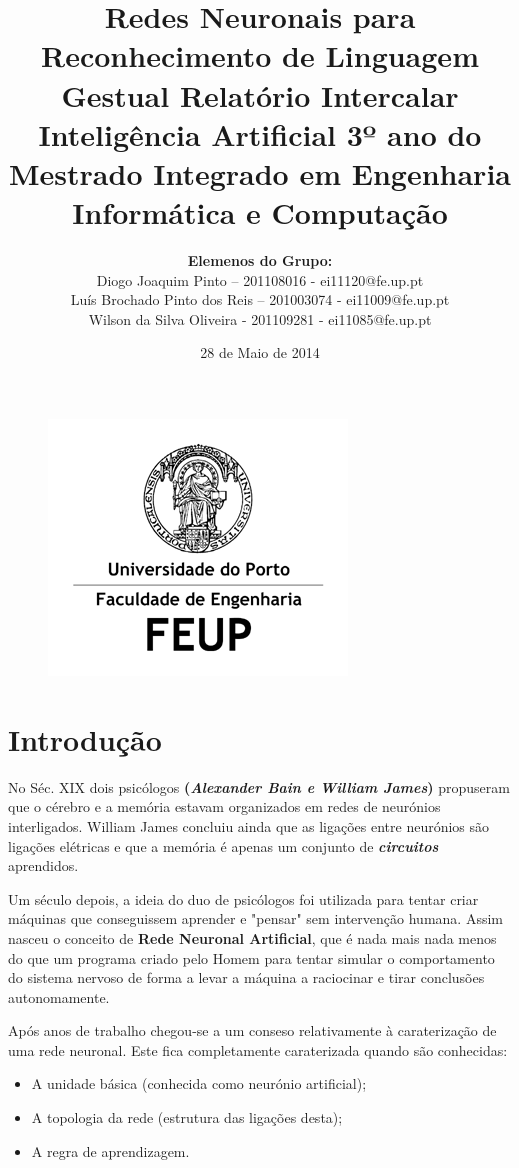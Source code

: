 \documentclass[10pt,a4paper]{article}
\title{\Huge\textbf{Redes Neuronais para Reconhecimento de Linguagem Gestual}\linebreak\linebreak\linebreak
\Large\textbf{Relatório Intercalar}\linebreak\linebreak
\Large{Inteligência Artificial}\linebreak
\Large{3º ano do Mestrado Integrado em Engenharia Informática e Computação} \linebreak \linebreak}
\author{\textbf{Elemenos do Grupo:}\\ Diogo Joaquim Pinto – 201108016 - ei11120@fe.up.pt \\ Luís Brochado Pinto dos Reis – 201003074 - ei11009@fe.up.pt \\ Wilson da Silva Oliveira - 201109281 - ei11085@fe.up.pt}
\date{28 de Maio de 2014}
\begin{document}
\begin{figure}
\centering
\includegraphics[width=0.7\linewidth]{./LogoFeup}
\end{figure}

\maketitle

\tableofcontents

\newpage

\section{Introdução}
 
 No Séc. XIX dois psicólogos \textbf{(\textit{Alexander Bain e William James})} propuseram que o cérebro e a memória estavam organizados em redes de neurónios interligados. William James concluiu ainda que as ligações entre neurónios são ligações elétricas e que a memória é apenas um conjunto de \textbf{\textit{circuitos}} aprendidos.
 
 Um século depois, a ideia do duo de psicólogos foi utilizada para tentar criar máquinas que conseguissem aprender e "pensar" sem intervenção humana. Assim nasceu o conceito de \textbf{Rede Neuronal Artificial}, que é nada mais nada menos do que um programa criado pelo Homem para tentar simular o comportamento do sistema nervoso de forma a levar a máquina a raciocinar e tirar conclusões autonomamente.
 
 Após anos de trabalho chegou-se a um conseso relativamente à caraterização de uma rede neuronal. Este fica completamente caraterizada quando são conhecidas:
 \begin{itemize}
 \item A unidade básica (conhecida como neurónio artificial);
 \item A topologia da rede (estrutura das ligações desta);
 \item A regra de aprendizagem.
 \end{itemize}
 
\end{document}
